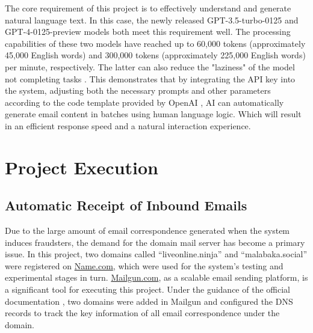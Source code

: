 \documentclass[ oneside,%
                    author={Cassie Qing Tang},
                    degree={BSc},
                     title={An Automated Response System for Disrupting Online Pet Scamming \\ },
                    subtitle={ }]{dissertation}
\begin{document}
The core requirement of this project is to effectively understand and generate natural language text. In this case, the newly released GPT-3.5-turbo-0125 and GPT-4-0125-preview models both meet this requirement well. The processing capabilities of these two models have reached up to 60,000 tokens (approximately 45,000 English words) and 300,000 tokens (approximately 225,000 English words) per minute, respectively. The latter can also reduce the "laziness" of the model not completing tasks \cite{noauthor_openai_nodate}. This demonstrates that by integrating the API key into the system, adjusting both the necessary prompts and other parameters according to the code template provided by OpenAI \cite{noauthor_openai_nodate}, AI can automatically generate email content in batches using human language logic. Which will result in an efficient response speed and a natural interaction experience.




\chapter{Project Execution}
\section{Automatic Receipt of Inbound Emails}
Due to the large amount of email correspondence generated when the system induces fraudsters, the demand for the domain mail server has become a primary issue. In this project, two domains called “liveonline.ninja” and “malabaka.social” were registered on \href{https://www.name.com}{Name.com}, which were used for the system's testing and experimental stages in turn. \href{https://www.mailgun.com}{Mailgun.com}, as a scalable email sending platform, is a significant tool for executing this project. Under the guidance of the official documentation \cite{noauthor_domain_nodate}, two domains were added in Mailgun and configured the DNS records to track the key information of all email correspondence under the domain.
\\
\end{document}
